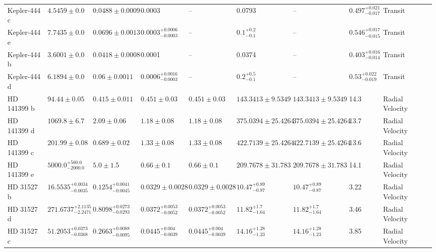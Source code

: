 \begin{tabular}{llllllllll}
Kepler-444 c & $4.5459 \pm 0.0$ & $0.0488 \pm 0.0009$ & 0.0003 & -- & 0.0793 & -- & $0.497^{+0.021}_{-0.017}$ & Transit & \cite{CAMPANTE_ET_AL__2015} \\
Kepler-444 e & $7.7435 \pm 0.0$ & $0.0696 \pm 0.0013$ & $0.0003^{+0.0006}_{-0.0003}$ & -- & $0.1^{+0.2}_{-0.1}$ & -- & $0.546^{+0.017}_{-0.015}$ & Transit & \cite{CAMPANTE_ET_AL__2015} \\
Kepler-444 b & $3.6001 \pm 0.0$ & $0.0418 \pm 0.0008$ & 0.0001 & -- & 0.0374 & -- & $0.403^{+0.016}_{-0.014}$ & Transit & \cite{CAMPANTE_ET_AL__2015} \\
Kepler-444 d & $6.1894 \pm 0.0$ & $0.06 \pm 0.0011$ & $0.0006^{+0.0016}_{-0.0003}$ & -- & $0.2^{+0.5}_{-0.1}$ & -- & $0.53^{+0.022}_{-0.019}$ & Transit & \cite{CAMPANTE_ET_AL__2015} \\
HD 141399 b & $94.44 \pm 0.05$ & $0.415 \pm 0.011$ & $0.451 \pm 0.03$ & $0.451 \pm 0.03$ & $143.3413 \pm 9.5349$ & $143.3413 \pm 9.5349$ & 14.3 & Radial Velocity & \cite{H_EACUTE_BRARD_ET_AL__2016} \\
HD 141399 d & $1069.8 \pm 6.7$ & $2.09 \pm 0.06$ & $1.18 \pm 0.08$ & $1.18 \pm 0.08$ & $375.0394 \pm 25.4264$ & $375.0394 \pm 25.4264$ & 13.7 & Radial Velocity & \cite{H_EACUTE_BRARD_ET_AL__2016} \\
HD 141399 c & $201.99 \pm 0.08$ & $0.689 \pm 0.02$ & $1.33 \pm 0.08$ & $1.33 \pm 0.08$ & $422.7139 \pm 25.4264$ & $422.7139 \pm 25.4264$ & 13.6 & Radial Velocity & \cite{H_EACUTE_BRARD_ET_AL__2016} \\
HD 141399 e & $5000.0^{+560.0}_{-2000.0}$ & $5.0 \pm 1.5$ & $0.66 \pm 0.1$ & $0.66 \pm 0.1$ & $209.7678 \pm 31.783$ & $209.7678 \pm 31.783$ & 14.1 & Radial Velocity & \cite{H_EACUTE_BRARD_ET_AL__2016} \\
HD 31527 b & $16.5535^{+0.0034}_{-0.0035}$ & $0.1254^{+0.0041}_{-0.0045}$ & $0.0329 \pm 0.0028$ & $0.0329 \pm 0.0028$ & $10.47^{+0.89}_{-0.87}$ & $10.47^{+0.89}_{-0.87}$ & 3.22 & Radial Velocity & \cite{UDRY_ET_AL__2019} \\
HD 31527 d & $271.6737^{+2.1135}_{-2.2471}$ & $0.8098^{+0.0273}_{-0.0293}$ & $0.0372^{+0.0053}_{-0.0052}$ & $0.0372^{+0.0053}_{-0.0052}$ & $11.82^{+1.7}_{-1.64}$ & $11.82^{+1.7}_{-1.64}$ & 3.46 & Radial Velocity & \cite{UDRY_ET_AL__2019} \\
HD 31527 c & $51.2053^{+0.0373}_{-0.0368}$ & $0.2663^{+0.0088}_{-0.0095}$ & $0.0445^{+0.004}_{-0.0039}$ & $0.0445^{+0.004}_{-0.0039}$ & $14.16^{+1.28}_{-1.23}$ & $14.16^{+1.28}_{-1.23}$ & 3.85 & Radial Velocity & \cite{UDRY_ET_AL__2019} \\

\end{tabular}

